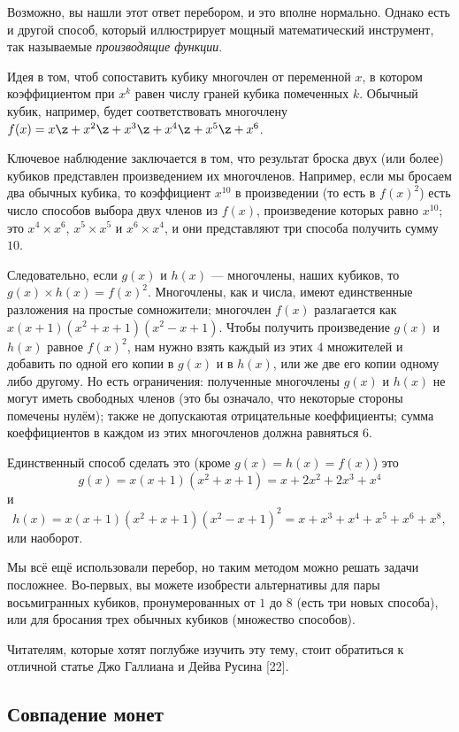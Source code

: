 Возможно, вы нашли этот ответ перебором, и это вполне нормально.
Однако есть и другой способ, который иллюстрирует мощный математический инструмент, так называемые \emph{производящие функции}.

Идея в том, чтоб сопоставить кубику многочлен от переменной $x$, в котором коэффициентом при $x^k$ равен числу граней кубика помеченных $k$.
Обычный кубик, например, будет соответствовать многочлену $f(x) = x \z+ x^2 \z+ x^3 \z+ x^4 \z+ x^5 \z+ x^6$.

Ключевое наблюдение заключается в том, что результат броска двух (или более) кубиков представлен произведением их многочленов.
Например, если мы бросаем два обычных кубика, то коэффициент $x^{10}$ в произведении (то есть в $f(x)^2$) есть число способов выбора двух членов из $f(x)$, произведение которых равно $x^{10}$;
это $x^4 \times x^6$, $x^5 \times x^5$ и $x^6 \times x^4$, и они представляют три способа получить сумму $10$.

Следовательно, если $g(x)$ и $h(x)$ --- многочлены, наших кубиков, то $g(x) \times h(x) = f(x)^2$.
Многочлены, как и числа, имеют единственные разложения на простые сомножители;
многочлен $f(x)$ разлагается как $x(x + 1)(x^2 + x + 1)(x^2 - x + 1)$.
Чтобы получить произведение $g(x)$ и $h(x)$ равное $f(x)^2$, нам нужно взять каждый из этих $4$ множителей и добавить по одной его копии в $g(x)$ и в $h(x)$, или же две его копии одному либо другому.
Но есть ограничения: полученные многочлены $g(x)$ и $h(x)$ не могут иметь свободных членов (это бы означало, что некоторые стороны помечены нулём);
также не допускаютая отрицательные коеффициенты;
сумма коеффициентов в каждом из этих многочленов должна равняться 6.


Единственный способ сделать это (кроме $g(x) = h(x) = f(x)$) это
\[g(x)
=
x(x + 1)(x^2 + x + 1)
=
x + 2x^2 + 2x^3 + x^4\]
и
\[h(x)
=
x(x + 1)(x^2 + x + 1)(x^2 - x + 1)^2
=
x + x^3 + x^4 + x^5 + x^6 + x^8,\]
или наоборот.

Мы всё ещё использовали перебор, но таким методом можно решать задачи посложнее.
Во-первых, вы можете изобрести альтернативы для пары восьмигранных кубиков, пронумерованных от $1$ до $8$ (есть три новых способа), или для бросания трех обычных кубиков (множество способов).

Читателям, которые хотят поглубже изучить эту тему, стоит обратиться к отличной статье Джо Галлиана и Дейва Русина [22].


\subsection*{Совпадение монет}

